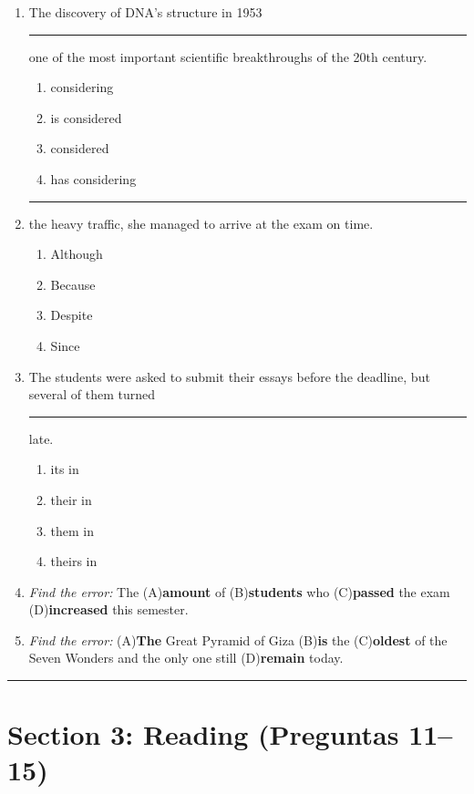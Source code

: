 \documentclass[10pt,a4paper]{article}
\begin{document}
\begin{enumerate}[leftmargin=*, label=\textbf{\arabic*.}, start=6]

\item The discovery of DNA's structure in 1953 \rule{2cm}{0.4pt}
one of the most important scientific breakthroughs of the 20th century.
\begin{enumerate}[label=(\Alph*)]
  \item considering
  \item is considered
  \item considered
  \item has considering
\end{enumerate}

\item \rule{2cm}{0.4pt} the heavy traffic, she managed to
arrive at the exam on time.
\begin{enumerate}[label=(\Alph*)]
  \item Although
  \item Because
  \item Despite
  \item Since
\end{enumerate}

\item The students were asked to submit their essays before
the deadline, but several of them turned \rule{2cm}{0.4pt} late.
\begin{enumerate}[label=(\Alph*)]
  \item its in
  \item their in
  \item them in
  \item theirs in
\end{enumerate}

\item \textit{Find the error:}
The (A)\textbf{amount} of (B)\textbf{students} who
(C)\textbf{passed} the exam (D)\textbf{increased} this semester.

\item \textit{Find the error:}
(A)\textbf{The} Great Pyramid of Giza (B)\textbf{is} the
(C)\textbf{oldest} of the Seven Wonders and the only one
still (D)\textbf{remain} today.

\end{enumerate}

\vspace{6pt}
\rule{\textwidth}{0.4pt}

\section*{Section 3: Reading (Preguntas 11--15)}
\end{document}
